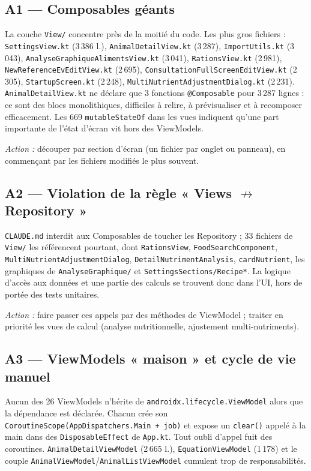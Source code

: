 \documentclass[11pt,a4paper]{article}
\newcommand{\code}[1]{\texttt{#1}}
\newcommand{\prio}[1]{\textbf{\textcolor{#1}{\textbullet}}}
\begin{document}
\subsection*{\prio{red!80!black} A1 --- Composables géants}
La couche \code{View/} concentre près de la moitié du code. Les plus gros fichiers :
\code{SettingsView.kt} (3\,386 l.), \code{AnimalDetailView.kt} (3\,287), \code{ImportUtils.kt} (3\,043),
\code{AnalyseGraphiqueAlimentsView.kt} (3\,041), \code{RationsView.kt} (2\,981),
\code{NewReferenceEvEditView.kt} (2\,695), \code{ConsultationFullScreenEditView.kt} (2\,305),
\code{StartupScreen.kt} (2\,248), \code{MultiNutrientAdjustmentDialog.kt} (2\,231).
\code{AnimalDetailView.kt} ne déclare que 3 fonctions \code{@Composable} pour 3\,287 lignes :
ce sont des blocs monolithiques, difficiles à relire, à prévisualiser et à recomposer
efficacement. Les 669 \code{mutableStateOf} dans les vues indiquent qu'une part importante
de l'état d'écran vit hors des ViewModels.

\emph{Action :} découper par section d'écran (un fichier par onglet ou panneau), en
commençant par les fichiers modifiés le plus souvent.

\subsection*{\prio{red!80!black} A2 --- Violation de la règle « Views $\not\to$ Repository »}
\code{CLAUDE.md} interdit aux Composables de toucher les Repository ; 33 fichiers de
\code{View/} les référencent pourtant, dont \code{RationsView}, \code{FoodSearchComponent},
\code{MultiNutrientAdjustmentDialog}, \code{DetailNutrimentAnalysis}, \code{cardNutrient},
les graphiques de \code{AnalyseGraphique/} et \code{SettingsSections/Recipe*}.
La logique d'accès aux données et une partie des calculs se trouvent donc dans l'UI,
hors de portée des tests unitaires.

\emph{Action :} faire passer ces appels par des méthodes de ViewModel ; traiter en
priorité les vues de calcul (analyse nutritionnelle, ajustement multi-nutriments).

\subsection*{\prio{orange} A3 --- ViewModels « maison » et cycle de vie manuel}
Aucun des 26 ViewModels n'hérite de \code{androidx.lifecycle.ViewModel} alors que la
dépendance est déclarée. Chacun crée son \code{CoroutineScope(AppDispatchers.Main + job)}
et expose un \code{clear()} appelé à la main dans des \code{DisposableEffect} de \code{App.kt}.
Tout oubli d'appel fuit des coroutines. \code{AnimalDetailViewModel} (2\,665 l.),
\code{EquationViewModel} (1\,178) et le couple \code{AnimalViewModel}/\code{AnimalListViewModel}
cumulent trop de responsabilités.
\end{document}
